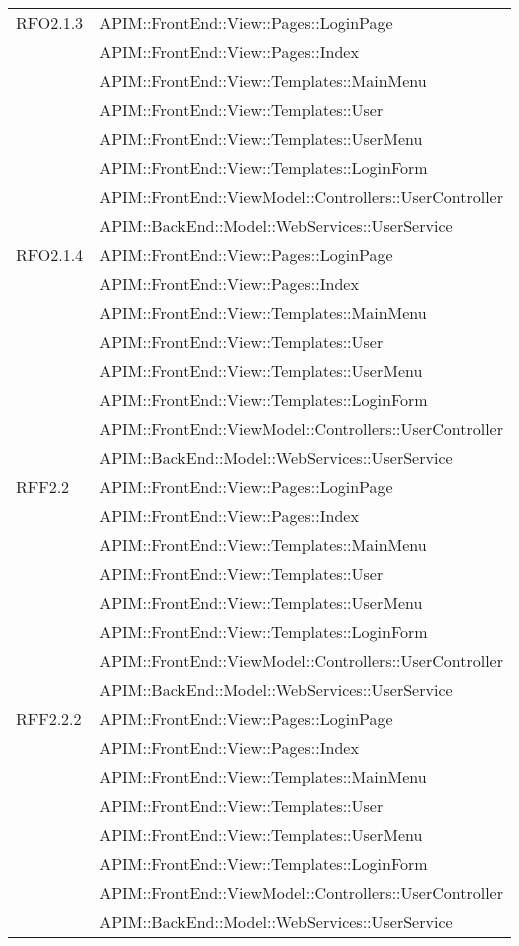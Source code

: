 \begin{longtable}{ p{4cm} | p{12cm} }
		    \hline RFO2.1.3
		    & APIM::FrontEnd::View::Pages::LoginPage \\
		    & APIM::FrontEnd::View::Pages::Index \\
		    & APIM::FrontEnd::View::Templates::MainMenu \\
		    & APIM::FrontEnd::View::Templates::User \\
		    & APIM::FrontEnd::View::Templates::UserMenu \\
		    & APIM::FrontEnd::View::Templates::LoginForm \\
			& APIM::FrontEnd::ViewModel::Controllers::UserController \\
			& APIM::BackEnd::Model::WebServices::UserService \\
			
		    \hline RFO2.1.4
		    & APIM::FrontEnd::View::Pages::LoginPage \\
		    & APIM::FrontEnd::View::Pages::Index \\
		    & APIM::FrontEnd::View::Templates::MainMenu \\
		    & APIM::FrontEnd::View::Templates::User \\
		    & APIM::FrontEnd::View::Templates::UserMenu \\
		    & APIM::FrontEnd::View::Templates::LoginForm \\
			& APIM::FrontEnd::ViewModel::Controllers::UserController \\
			& APIM::BackEnd::Model::WebServices::UserService \\
			
		    \hline RFF2.2
		    & APIM::FrontEnd::View::Pages::LoginPage \\
		    & APIM::FrontEnd::View::Pages::Index \\
		    & APIM::FrontEnd::View::Templates::MainMenu \\
		    & APIM::FrontEnd::View::Templates::User \\
		    & APIM::FrontEnd::View::Templates::UserMenu \\
		    & APIM::FrontEnd::View::Templates::LoginForm \\
			& APIM::FrontEnd::ViewModel::Controllers::UserController \\
			& APIM::BackEnd::Model::WebServices::UserService \\
			
		    \hline RFF2.2.2
		    & APIM::FrontEnd::View::Pages::LoginPage \\
		    & APIM::FrontEnd::View::Pages::Index \\
		    & APIM::FrontEnd::View::Templates::MainMenu \\
		    & APIM::FrontEnd::View::Templates::User \\
		    & APIM::FrontEnd::View::Templates::UserMenu \\
		    & APIM::FrontEnd::View::Templates::LoginForm \\
			& APIM::FrontEnd::ViewModel::Controllers::UserController \\
			& APIM::BackEnd::Model::WebServices::UserService \\
			

\end{longtable}
